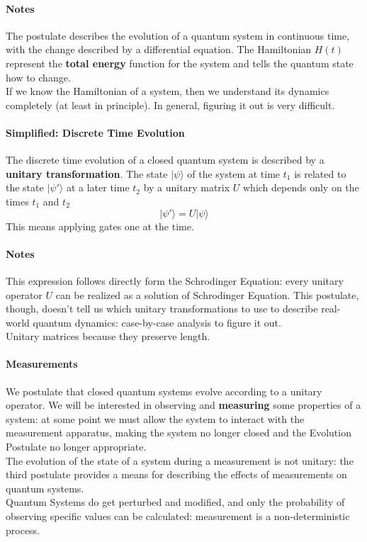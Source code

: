 \documentclass[10pt]{report}
\begin{document}
\paragraph{Notes} The postulate describes the evolution of a quantum system in continuous time, with the change described by a differential equation. The Hamiltonian $H(t)$ represent the \textbf{total energy} function for the system and tells the quantum state how to change.\\
If we know the Hamiltonian of a system, then we understand its dynamics completely (at least in principle). In general, figuring it out is very difficult.
\paragraph{Simplified: Discrete Time Evolution} The discrete time evolution of a closed quantum system is described by a \textbf{unitary transformation}. The state $|\psi\rangle$ of the system at time $t_1$ is related to the state $|\psi'\rangle$ at a later time $t_2$ by a unitary matrix $U$ which depends only on the times $t_1$ and $t_2$ $$|\psi'\rangle = U|\psi\rangle$$
This means applying gates one at the time.
\paragraph{Notes} This expression follows directly form the Schrodinger Equation: every unitary operator $U$ can be realized as a solution of Schrodinger Equation. This postulate, though, doesn't tell us which unitary transformations to use to describe real-world quantum dynamics: case-by-case analysis to figure it out.\\
Unitary matrices because they preserve length.
\paragraph{Measurements} We postulate that closed quantum systems evolve according to a unitary operator. We will be interested in observing and \textbf{measuring} some properties of a system: at some point we must allow the system to interact with the measurement apparatus, making the system no longer closed and the Evolution Postulate no longer appropriate.\\
The evolution of the state of a system during a measurement is not unitary: the third postulate provides a means for describing the effects of measurements on quantum systems.\\
Quantum Systems do get perturbed and modified, and only the probability of observing specific values can be calculated: measurement is a non-deterministic process.
\end{document}
